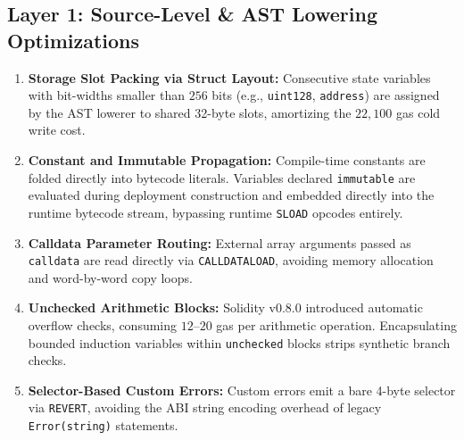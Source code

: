 \documentclass[conference]{IEEEtran}
\begin{document}
\subsection{Layer 1: Source-Level \& AST Lowering Optimizations}
\begin{enumerate}
    \item \textbf{Storage Slot Packing via Struct Layout:} Consecutive state variables with bit-widths smaller than $256$ bits (e.g., \texttt{uint128}, \texttt{address}) are assigned by the AST lowerer to shared 32-byte slots, amortizing the $22,100$ gas cold write cost.
    \item \textbf{Constant and Immutable Propagation:} Compile-time constants are folded directly into bytecode literals. Variables declared \texttt{immutable} are evaluated during deployment construction and embedded directly into the runtime bytecode stream, bypassing runtime \texttt{SLOAD} opcodes entirely.
    \item \textbf{Calldata Parameter Routing:} External array arguments passed as \texttt{calldata} are read directly via \texttt{CALLDATALOAD}, avoiding memory allocation and word-by-word copy loops.
    \item \textbf{Unchecked Arithmetic Blocks:} Solidity v0.8.0 introduced automatic overflow checks, consuming $12$--$20$ gas per arithmetic operation. Encapsulating bounded induction variables within \texttt{unchecked} blocks strips synthetic branch checks.
    \item \textbf{Selector-Based Custom Errors:} Custom errors emit a bare 4-byte selector via \texttt{REVERT}, avoiding the ABI string encoding overhead of legacy \texttt{Error(string)} statements.
\end{enumerate}
\end{document}
